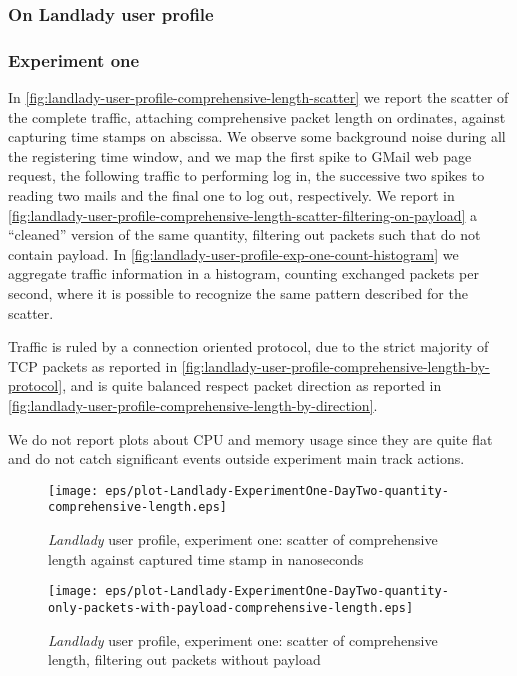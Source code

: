 \documentclass[10pt,a4paper]{article}
\begin{document}
    \subsubsection{On Landlady user profile}

    \subsubsection*{Experiment one}
    In
    \autoref{fig:landlady-user-profile-comprehensive-length-scatter}
    we report the scatter of the complete traffic, attaching
    comprehensive packet length on ordinates, against capturing
    time stamps on abscissa. We observe some background noise during
    all the registering time window, and we map the first spike to
    GMail web page request, the following traffic to performing log in,
    the successive two spikes to reading two mails and the final one
    to log out, respectively. We report in
    \autoref{fig:landlady-user-profile-comprehensive-length-scatter-filtering-on-payload}
    a ``cleaned'' version of the same quantity, filtering out packets
    such that do not contain payload. In
    \autoref{fig:landlady-user-profile-exp-one-count-histogram} we
    aggregate traffic information in a histogram, counting exchanged
    packets per second, where it is possible to recognize the same
    pattern described for the scatter.

    Traffic is ruled by a connection oriented protocol, due to the
    strict majority of TCP packets as reported in
    \autoref{fig:landlady-user-profile-comprehensive-length-by-protocol},
    and is quite balanced respect packet direction as reported in
    \autoref{fig:landlady-user-profile-comprehensive-length-by-direction}.
    
    We do not report plots about CPU and memory usage since they are
    quite flat and do not catch significant events outside experiment
    main track actions.

    \begin{figure}
      \centering
      \texttt{[image: eps/plot-Landlady-ExperimentOne-DayTwo-quantity-comprehensive-length.eps]}
      \caption{\emph{Landlady} user profile, experiment one:
        scatter of comprehensive length against captured time stamp in
        nanoseconds}
      \label{fig:landlady-user-profile-comprehensive-length-scatter}
    \end{figure}

    \begin{figure}
      \centering
      \texttt{[image: eps/plot-Landlady-ExperimentOne-DayTwo-quantity-only-packets-with-payload-comprehensive-length.eps]}
      \caption{\emph{Landlady} user profile, experiment one: scatter
        of comprehensive length, filtering out packets without
        payload}
      \label{fig:landlady-user-profile-comprehensive-length-scatter-filtering-on-payload}
    \end{figure}
\end{document}

